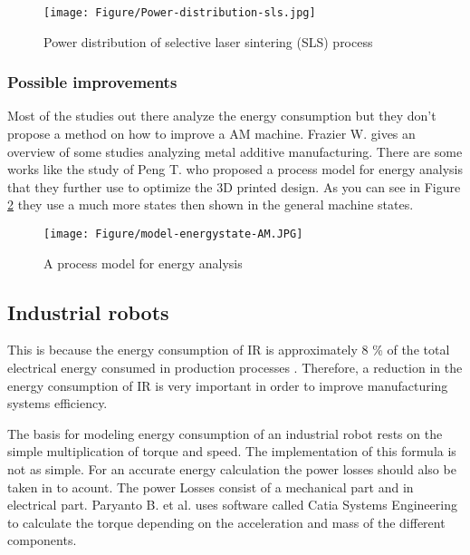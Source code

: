 \begin{figure}[h!]
	\centering
	\texttt{[image: Figure/Power-distribution-sls.jpg]}
	\caption{Power distribution of selective laser sintering (SLS) process \cite{Yoon2014}}
	\label{fig:powerdistribution}
\end{figure}

\subsubsection{Possible improvements}

Most of the studies out there analyze the energy consumption but they don't propose a method on how to improve a AM machine. Frazier W. \cite{Frazier2014} gives an overview of some studies analyzing metal additive manufacturing. There are some works like the study of Peng T. \cite{Peng2016} who proposed a process model for energy analysis that they further use to optimize the 3D printed design. As you can see in Figure \ref{fig:energyanalysismodelAM} they use a much more states then shown in the general machine states.
\begin{figure}[h!]
	\centering
	\texttt{[image: Figure/model-energystate-AM.JPG]}
	\caption{A process model for energy analysis \cite{Peng2016}}
	\label{fig:energyanalysismodelAM}
\end{figure}



\subsection{Industrial robots}


This is because the energy consumption of IR is approximately 8 \% of the total electrical energy consumed in production processes \cite{Engelmann2009}. Therefore, a reduction in the energy consumption of IR is very important in order to improve manufacturing systems efficiency.

The basis for modeling energy consumption of an industrial robot rests on the simple multiplication of torque and speed. The implementation of this formula is not as simple. For an accurate energy calculation the power losses should also be taken in to acount. The power Losses consist of a mechanical part and in electrical part. Paryanto B. et al. \cite{Paryanto2015} uses software called Catia Systems Engineering to calculate the torque depending on the acceleration and mass of the different components.

